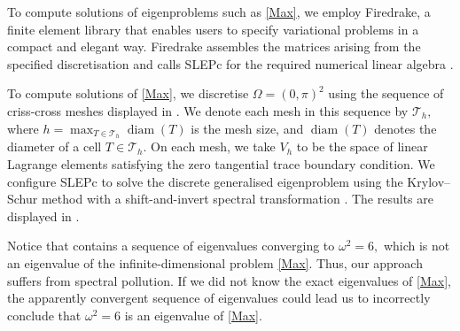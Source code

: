 

To compute solutions of eigenproblems such as \eqref{Max}, we employ Firedrake, a finite element library that enables users to specify variational problems in a compact and elegant way. Firedrake assembles the matrices arising from the specified discretisation and calls SLEPc for the required numerical linear algebra \cite{Firedrake,slep}. 


To compute solutions of \eqref{Max}, we discretise $\Omega = (0, \pi)^2$ using the sequence of criss-cross meshes displayed in . We denote each mesh in this sequence by $\mathcal{T}_h,$ where $h = \max_{T \in \mathcal{T}_h} \operatorname{diam}(T)$ is the mesh size, and $\operatorname{diam}(T)$ denotes the diameter of a cell $T \in \mathcal{T}_h.$
On each mesh, we take $V_h$ to be the space of linear Lagrange elements satisfying the zero tangential trace boundary condition. We configure SLEPc to solve the discrete generalised eigenproblem using the Krylov--Schur method with a shift-and-invert spectral transformation \cite{krylov, slep}. The results are displayed in . 



Notice that  contains a sequence of eigenvalues converging to $\omega^2 = 6,$ which is not an eigenvalue of the infinite-dimensional problem \eqref{Max}. Thus, our approach suffers from spectral pollution. If we did not know the exact eigenvalues of \eqref{Max}, the apparently convergent sequence of eigenvalues could lead us to incorrectly conclude that $\omega^2=6$ is an eigenvalue of \eqref{Max}. 


